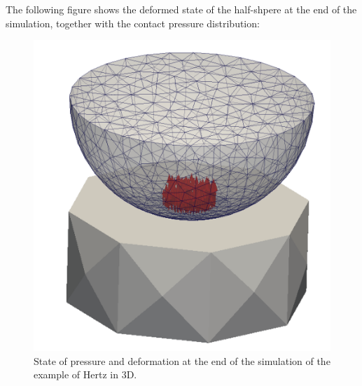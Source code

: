 The following figure shows the deformed state of the half-shpere at the end of the simulation, together with the contact pressure distribution:

\begin{figure}[htbp]
\begin{center}
\includegraphics[scale=0.3]{figures/hertz_3D.png}
\caption{State of pressure and deformation at the end of the simulation of the example of Hertz in 3D.}
\label{fig:hertz_3D}
\end{center}
\end{figure}



 
 